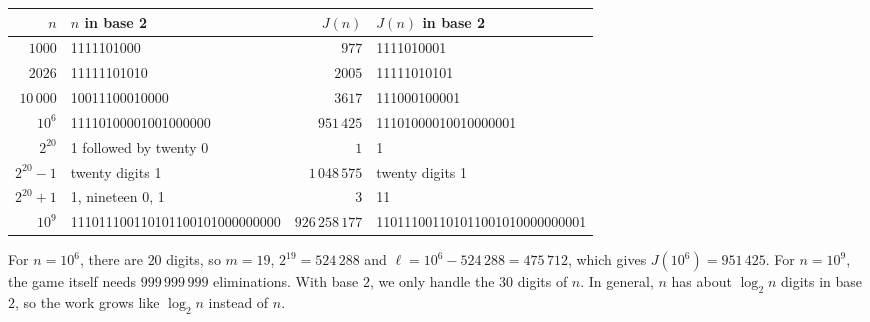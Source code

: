 \noindent\begin{minipage}{\textwidth}\centering
\renewcommand{\arraystretch}{1.15}
\footnotesize\setlength{\tabcolsep}{4pt}
\begin{tabular}{|r|l|r|l|}
\hline
$n$ & $n$ in base 2 & $J(n)$ & $J(n)$ in base 2\\ \hline
$1000$ & 1111101000 & $977$ & 1111010001\\
$2026$ & 11111101010 & $2005$ & 11111010101\\
$10\,000$ & 10011100010000 & $3617$ & 111000100001\\
$10^6$ & 11110100001001000000 & $951\,425$ & 11101000010010000001\\
$2^{20}$ & 1 followed by twenty 0 & $1$ & 1\\
$2^{20}-1$ & twenty digits 1 & $1\,048\,575$ & twenty digits 1\\
$2^{20}+1$ & 1, nineteen 0, 1 & $3$ & 11\\
$10^9$ & 111011100110101100101000000000 & $926\,258\,177$ & 110111001101011001010000000001\\ \hline
\end{tabular}
\label{tab:large}
\end{minipage}
\par\medskip

For $n=10^6$, there are $20$ digits, so $m=19$, $2^{19}=524\,288$ and
$\ell=10^6-524\,288=475\,712$, which gives $J(10^6)=951\,425$. For $n=10^9$,
the game itself needs $999\,999\,999$ eliminations. With base
$2$, we only handle the $30$ digits of $n$. In general, $n$ has about
$\log_2 n$ digits in base $2$, so the work grows like $\log_2 n$ instead of
$n$.
